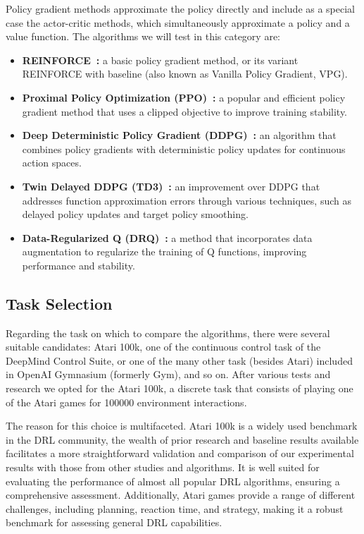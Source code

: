 Policy gradient methods approximate the policy directly and include as a special case the actor-critic methods, which simultaneously approximate a policy and a value function. The algorithms we will test in this category are:
\begin{itemize}
	\item \textbf{REINFORCE~\cite[Chapter~13]{sutton:rl}:} a basic policy gradient method, or its variant REINFORCE with baseline (also known as Vanilla Policy Gradient, VPG).
	\item \textbf{Proximal Policy Optimization (PPO)~\cite{schulman:ppo}:} a popular and efficient policy gradient method that uses a clipped objective to improve training stability.
	\item \textbf{Deep Deterministic Policy Gradient (DDPG)~\cite{lillicrap:ddpg}:} an algorithm that combines policy gradients with deterministic policy updates for continuous action spaces.
	\item \textbf{Twin Delayed DDPG (TD3)~\cite{fujimoto:td3}:} an improvement over DDPG that addresses function approximation errors through various techniques, such as delayed policy updates and target policy smoothing.
	\item \textbf{Data-Regularized Q (DRQ)~\cite{kostrikov:drq}:} a method that incorporates data augmentation to regularize the training of Q functions, improving performance and stability.
\end{itemize}


\subsection{Task Selection}
\label{subsec:task_selection}

Regarding the task on which to compare the algorithms, there were several suitable candidates: Atari 100k, one of the continuous control task of the DeepMind Control Suite, or one of the many other task (besides Atari) included in OpenAI Gymnasium (formerly Gym), and so on. After various tests and research we opted for the Atari 100k, a discrete task that consists of playing one of the Atari games for \num{100000} environment interactions.

The reason for this choice is multifaceted. Atari 100k is a widely used benchmark in the DRL community, the wealth of prior research and baseline results available facilitates a more straightforward validation and comparison of our experimental results with those from other studies and algorithms. It is well suited for evaluating the performance of almost all popular DRL algorithms, ensuring a comprehensive assessment. Additionally, Atari games provide a range of different challenges, including planning, reaction time, and strategy, making it a robust benchmark for assessing general DRL capabilities.

